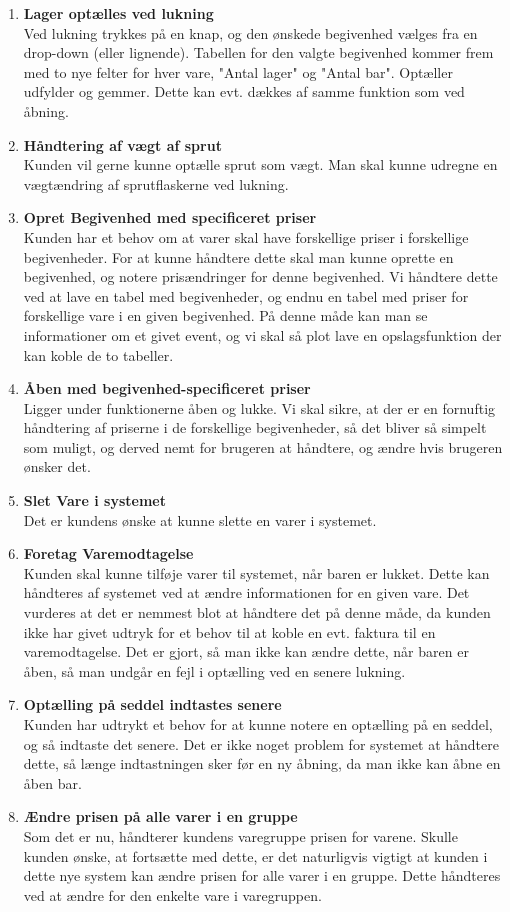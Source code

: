 \documentclass[]{article}
\begin{document}
\begin{enumerate} [label= \# \arabic*:]
	\item \textbf{Lager optælles ved lukning} \\Ved lukning trykkes på en knap, og den ønskede begivenhed vælges fra en drop-down (eller lignende). Tabellen for den valgte begivenhed kommer frem med to nye felter for hver vare, "Antal lager" og "Antal bar".  Optæller udfylder og gemmer. Dette kan evt. dækkes af samme funktion som ved åbning.
	\item  \textbf{Håndtering af vægt af sprut} \\Kunden vil gerne kunne optælle sprut som vægt. Man skal kunne udregne en vægtændring af sprutflaskerne ved lukning. 
	\item  \textbf{Opret Begivenhed med specificeret priser} \\ Kunden har et behov om at varer skal have forskellige priser i forskellige begivenheder. For at kunne håndtere dette skal man kunne oprette en begivenhed, og notere prisændringer for denne begivenhed. Vi håndtere dette ved at lave en tabel med begivenheder, og endnu en tabel med priser for forskellige vare i en given begivenhed. På denne måde kan man se informationer om et givet event, og vi skal så plot lave en opslagsfunktion der kan koble de to tabeller. 
	\item  \textbf{Åben med begivenhed-specificeret priser} \\Ligger under funktionerne åben og lukke. Vi skal sikre, at der er en fornuftig håndtering af priserne i de forskellige begivenheder, så det bliver så simpelt som muligt, og derved 	nemt for brugeren at håndtere, og ændre hvis brugeren ønsker det.
	\item  \textbf{Slet Vare i systemet} \\ Det er kundens ønske at kunne slette en varer i systemet.
	\item  \textbf{Foretag Varemodtagelse} \\ Kunden skal kunne tilføje varer til systemet, når baren er lukket. Dette kan håndteres af systemet ved at ændre informationen for en given vare. Det vurderes at det er nemmest blot at håndtere det på denne måde, da kunden ikke har givet udtryk for et behov til at koble en evt. faktura til en varemodtagelse. Det er gjort, så man ikke kan ændre dette, når baren er åben, så man undgår en fejl i optælling ved en senere lukning.
	\item  \textbf{Optælling på seddel indtastes senere} \\ Kunden har udtrykt et behov for at kunne notere en optælling på en seddel, og så indtaste det senere. Det er ikke noget problem for systemet at håndtere dette, så længe indtastningen sker før en ny åbning, da man ikke kan åbne en åben bar. 
	\item  \textbf{Ændre prisen på alle varer i en gruppe} \\ Som det er nu, håndterer kundens varegruppe prisen for varene. Skulle kunden ønske, at fortsætte med dette, er det naturligvis vigtigt at kunden i dette nye system kan ændre prisen for alle varer i en gruppe. Dette håndteres ved at ændre for den enkelte vare i varegruppen.
	\label{UseCases}
\end{enumerate}
\pagebreak[3]
\end{document}

